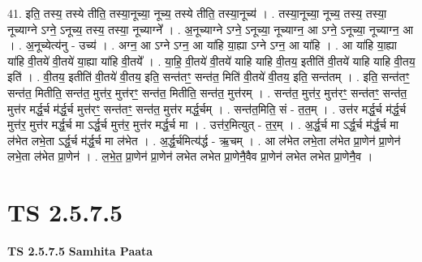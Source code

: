 \documentclass[17pt]{extarticle}
\begin{document}
41. इति॒ तस्य॒ तस्ये तीति॒ तस्या॒नूच्या॒ नूच्य॒ तस्ये तीति॒ तस्या॒नूच्य॑ । . तस्या॒नूच्या॒ नूच्य॒ तस्य॒ तस्या॒ नूच्याग्ने ऽग्ने॒ ऽनूच्य॒ तस्य॒ तस्या॒ नूच्याग्ने᳚ । . अ॒नूच्याग्ने ऽग्ने॒ ऽनूच्या॒ नूच्याग्न॒ आ ऽग्ने॒ ऽनूच्या॒ नूच्याग्न॒ आ । . अ॒नूच्येत्य॑नु - उच्य॑ । . अग्न॒ आ ऽग्ने ऽग्न॒ आ या॑हि या॒ह्या ऽग्ने ऽग्न॒ आ या॑हि । . आ या॑हि या॒ह्या या॑हि वी॒तये॑ वी॒तये॑ या॒ह्या या॑हि वी॒तये᳚ । . या॒हि॒ वी॒तये॑ वी॒तये॑ याहि याहि वी॒तय॒ इतीति॑ वी॒तये॑ याहि याहि वी॒तय॒ इति॑ । . वी॒तय॒ इतीति॑ वी॒तये॑ वी॒तय॒ इति॒ सन्त॑तꣳ॒॒ सन्त॑त॒ मिति॑ वी॒तये॑ वी॒तय॒ इति॒ सन्त॑तम् । . इति॒ सन्त॑तꣳ॒॒ सन्त॑त॒ मितीति॒ सन्त॑त॒ मुत्त॑र॒ मुत्त॑रꣳ॒॒ सन्त॑त॒ मितीति॒ सन्त॑त॒ मुत्त॑रम् । . सन्त॑त॒ मुत्त॑र॒ मुत्त॑रꣳ॒॒ सन्त॑तꣳ॒॒ सन्त॑त॒ मुत्त॑र मर्द्ध॒र्च म॑र्द्ध॒र्च मुत्त॑रꣳ॒॒ सन्त॑तꣳ॒॒ सन्त॑त॒ मुत्त॑र मर्द्ध॒र्चम् । . सन्त॑त॒मिति॒ सं - त॒त॒म् । . उत्त॑र मर्द्ध॒र्च म॑र्द्ध॒र्च मुत्त॑र॒ मुत्त॑र मर्द्ध॒र्च मा ऽर्द्ध॒र्च मुत्त॑र॒ मुत्त॑र मर्द्ध॒र्च मा । . उत्त॑र॒मित्युत् - त॒र॒म् । . अ॒र्द्ध॒र्च मा ऽर्द्ध॒र्च म॑र्द्ध॒र्च मा ल॑भेत लभे॒ता ऽर्द्ध॒र्च म॑र्द्ध॒र्च मा ल॑भेत । . अ॒र्द्ध॒र्चमित्य॑र्द्ध - ऋ॒चम् । . आ ल॑भेत लभे॒ता ल॑भेत प्रा॒णेन॑ प्रा॒णेन॑ लभे॒ता ल॑भेत प्रा॒णेन॑ । . ल॒भे॒त॒ प्रा॒णेन॑ प्रा॒णेन॑ लभेत लभेत प्रा॒णेनै॒वैव प्रा॒णेन॑ लभेत लभेत प्रा॒णेनै॒व । \newline
\pagebreak
{}

\section{ TS 2.5.7.5 }

\textbf{TS 2.5.7.5 } \newline
\textbf{Samhita Paata} \newline
\end{document}
